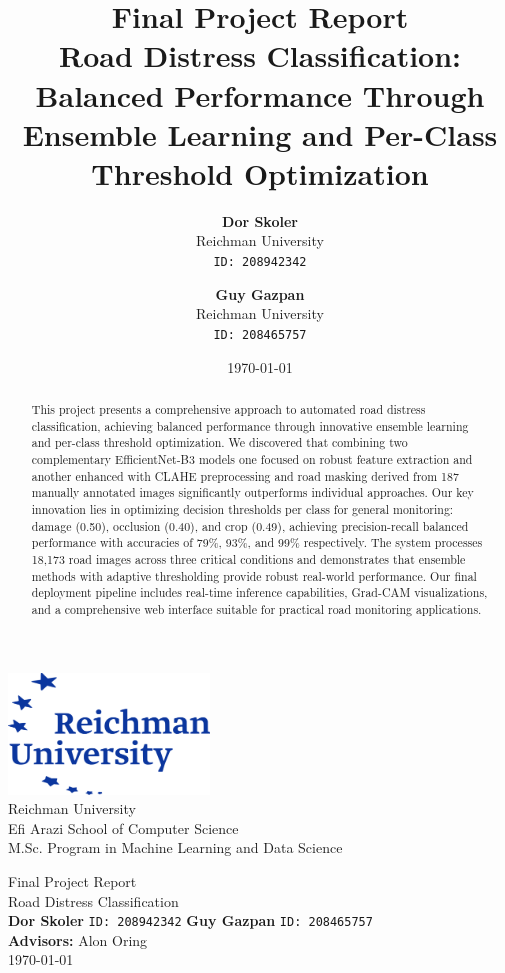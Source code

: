 \documentclass[12pt]{article}
\title{
    \Huge \textbf{Final Project Report}\\[1em]
    \Large \textbf{Road Distress Classification: Balanced Performance Through Ensemble Learning and Per-Class Threshold Optimization}
}
\author{%
  \textbf{Dor Skoler}\\
  Reichman University\\
  \texttt{ID: 208942342}%
  \and
  \textbf{Guy Gazpan}\\
  Reichman University\\
  \texttt{ID: 208465757}%
}
\date{\today}
\begin{document}
\begin{titlepage}
\centering
\includegraphics[width=0.4\textwidth]{images/runi_logo.png}\\[1em]
{\LARGE Reichman University}\\[1em]
{\large Efi Arazi School of Computer Science}\\[1em]
{\large M.Sc. Program in Machine Learning and Data Science}\\[1em]
\vspace{2.5em}

{\Huge Final Project Report}\\[1.5em]
{\Large Road Distress Classification}\\[1em]
{\small \textbf{Dor Skoler} \quad \texttt{ID: 208942342} \quad \textbf{Guy Gazpan} \quad \texttt{ID: 208465757}}\\[1em]
{\small \textbf{Advisors:} Alon Oring}\\[1em]
{\small \today}\\[2em]

\begin{abstract}
This project presents a comprehensive approach to automated road distress classification, achieving balanced performance through innovative ensemble learning and per-class threshold optimization. We discovered that combining two complementary EfficientNet-B3 models one focused on robust feature extraction and another enhanced with CLAHE preprocessing and road masking derived from 187 manually annotated images significantly outperforms individual approaches. Our key innovation lies in optimizing decision thresholds per class for general monitoring: damage (0.50), occlusion (0.40), and crop (0.49), achieving precision-recall balanced performance with accuracies of 79\%, 93\%, and 99\% respectively. The system processes 18,173 road images across three critical conditions and demonstrates that ensemble methods with adaptive thresholding provide robust real-world performance. Our final deployment pipeline includes real-time inference capabilities, Grad-CAM visualizations, and a comprehensive web interface suitable for practical road monitoring applications.
\end{abstract}

\end{titlepage}
\end{document}
